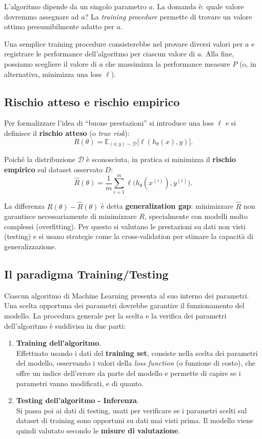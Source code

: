 \noindent
L'algoritmo dipende da un singolo parametro $a$. La domanda \`e: quale valore dovremmo assegnare ad $a$? La \emph{training procedure} permette di trovare un valore ottimo presumibilmente adatto per $a$.

\noindent
Una semplice training procedure consisterebbe nel provare diversi valori per $a$ e registrare le performance dell'algoritmo per ciascun valore di $a$. Alla fine, possiamo scegliere il valore di $a$ che massimizza la performance measure $P$ (o, in alternativa, minimizza una loss $\ell$).

\subsection{Rischio atteso e rischio empirico}

Per formalizzare l'idea di ``buone prestazioni'' si introduce una loss $\ell$ e si definisce il \textbf{rischio atteso} (o \emph{true risk}):
\[
R(\theta) = \mathbb{E}_{(x,y)\sim \mathcal{D}}\bigl[\ell(h_\theta(x), y)\bigr].
\]

\noindent
Poich\'e la distribuzione $\mathcal{D}$ \`e sconosciuta, in pratica si minimizza il \textbf{rischio empirico} sul dataset osservato $D$:
\[
\hat{R}(\theta) = \frac{1}{m}\sum_{i=1}^m \ell\bigl(h_\theta(x^{(i)}), y^{(i)}\bigr).
\]

\noindent
La differenza $R(\theta) - \hat{R}(\theta)$ \`e detta \textbf{generalization gap}: minimizzare $\hat{R}$ non garantisce necessariamente di minimizzare $R$, specialmente con modelli molto complessi (overfitting). Per questo si valutano le prestazioni su dati non visti (testing) e si usano strategie come la cross-validation per stimare la capacit\`a di generalizzazione.

\subsection{Il paradigma Training/Testing}

Ciascun algoritmo di Machine Learning presenta al suo interno dei parametri. Una scelta opportuna dei parametri dovrebbe garantire il funzionamento del modello. La procedura generale per la scelta e la verifica dei parametri dell'algoritmo \`e suddivisa in due parti:

\begin{enumerate}
\item \textbf{Training dell'algoritmo}.\\
Effettuato usando i dati del \textbf{training set}, consiste nella scelta dei parametri del modello, osservando i valori della \textit{loss function} (o funzione di costo), che offre un indice dell'errore da parte del modello e permette di capire se i parametri vanno modificati, e di quanto.
\item \textbf{Testing dell'algoritmo - Inferenza}.\\
Si passa poi ai dati di testing, usati per verificare se i parametri scelti sul dataset di training sono opportuni su dati mai visti prima. Il modello viene quindi valutato secondo le \textbf{misure di valutazione}.
\end{enumerate}

